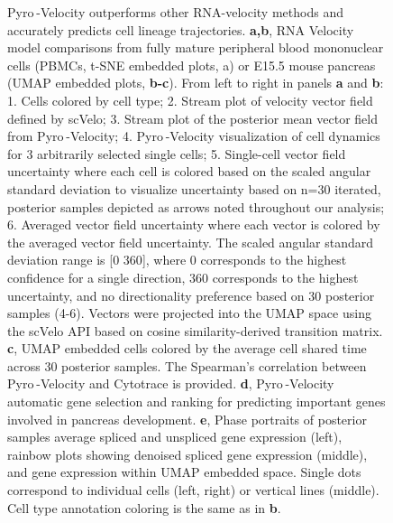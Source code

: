 \documentclass[
  sn-mathphys-num,
  lineno,
  twocolumn]{sn-jnl}
\let\oldincludegraphics\includegraphics
\renewcommand{\includegraphics}[2][]{\oldincludegraphics[#1,keepaspectratio]{#2}}
\begin{document}
\begin{figure}


\caption{\label{fig-model-results}Pyro -Velocity outperforms other
RNA-velocity methods and accurately predicts cell lineage trajectories.
\textbf{a,b}, RNA Velocity model comparisons from fully mature
peripheral blood mononuclear cells (PBMCs, t-SNE embedded plots, a) or
E15.5 mouse pancreas (UMAP embedded plots, \textbf{b-c}). From left to
right in panels \textbf{a} and \textbf{b}: 1. Cells colored by cell
type; 2. Stream plot of velocity vector field defined by scVelo; 3.
Stream plot of the posterior mean vector field from Pyro -Velocity; 4.
Pyro -Velocity visualization of cell dynamics for 3 arbitrarily selected
single cells; 5. Single-cell vector field uncertainty where each cell is
colored based on the scaled angular standard deviation to visualize
uncertainty based on n=30 iterated, posterior samples depicted as arrows
noted throughout our analysis; 6. Averaged vector field uncertainty
where each vector is colored by the averaged vector field uncertainty.
The scaled angular standard deviation range is {[}0 360{]}, where 0
corresponds to the highest confidence for a single direction, 360
corresponds to the highest uncertainty, and no directionality preference
based on 30 posterior samples (4-6). Vectors were projected into the
UMAP space using the scVelo API based on cosine similarity-derived
transition matrix. \textbf{c}, UMAP embedded cells colored by the
average cell shared time across 30 posterior samples. The Spearman's
correlation between Pyro -Velocity and Cytotrace is provided.
\textbf{d}, Pyro -Velocity automatic gene selection and ranking for
predicting important genes involved in pancreas development. \textbf{e},
Phase portraits of posterior samples average spliced and unspliced gene
expression (left), rainbow plots showing denoised spliced gene
expression (middle), and gene expression within UMAP embedded space.
Single dots correspond to individual cells (left, right) or vertical
lines (middle). Cell type annotation coloring is the same as in
\textbf{b}.}

\end{figure}%
\end{document}
